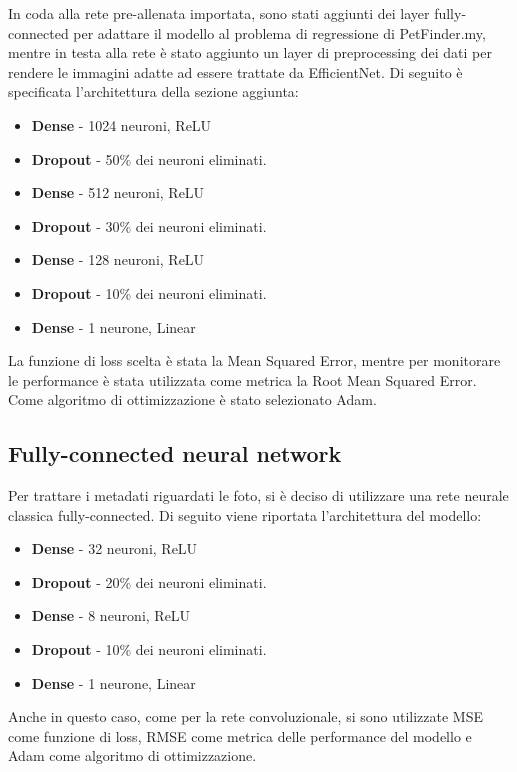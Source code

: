         In coda alla rete pre-allenata importata, sono stati aggiunti dei layer fully-connected per adattare il modello al problema di regressione di PetFinder.my, mentre in testa alla rete è stato aggiunto un layer di preprocessing dei dati per rendere le immagini adatte ad essere trattate da EfficientNet. Di seguito
        è specificata l'architettura della sezione aggiunta:
        \begin{itemize}
            \item \textbf{Dense} - 1024 neuroni, ReLU
            \item \textbf{Dropout} - 50\% dei neuroni eliminati.
            \item \textbf{Dense} - 512 neuroni, ReLU
            \item \textbf{Dropout} - 30\% dei neuroni eliminati.
            \item \textbf{Dense} - 128 neuroni, ReLU
            \item \textbf{Dropout} - 10\% dei neuroni eliminati.
            \item \textbf{Dense} - 1 neurone, Linear
        \end{itemize}

        La funzione di loss scelta è stata la Mean Squared Error, mentre per monitorare le performance è stata utilizzata come metrica la Root Mean Squared Error. Come algoritmo di ottimizzazione è stato selezionato Adam.

    \subsection{Fully-connected neural network}
    \label{mlp}
    Per trattare i metadati riguardati le foto, si è deciso di utilizzare una rete neurale classica fully-connected. Di seguito viene 
    riportata l'architettura del modello:
    \begin{itemize}
        \item \textbf{Dense} - 32 neuroni, ReLU
        \item \textbf{Dropout} - 20\% dei neuroni eliminati.
        \item \textbf{Dense} - 8 neuroni, ReLU
        \item \textbf{Dropout} - 10\% dei neuroni eliminati.
        \item \textbf{Dense} - 1 neurone, Linear
    \end{itemize}

    Anche in questo caso, come per la rete convoluzionale, si sono utilizzate MSE come funzione di loss, RMSE come metrica delle performance del modello e Adam come algoritmo di ottimizzazione.

